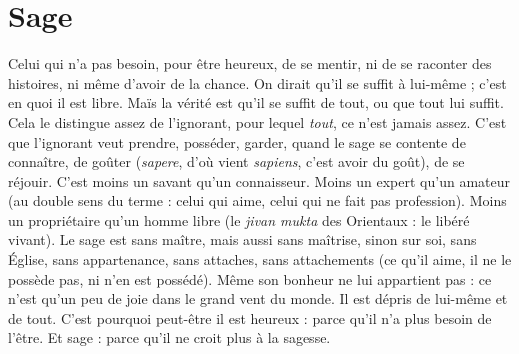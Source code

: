 \section{Sage}
Celui qui n’a pas besoin, pour être heureux, de se mentir, ni de se
raconter des histoires, ni même d’avoir de la chance. On dirait qu’il
se suffit à lui-même ; c’est en quoi il est libre. Maïs la vérité est qu’il se suffit de
tout, ou que tout lui suffit. Cela le distingue assez de l’ignorant, pour lequel
{\it tout}, ce n'est jamais assez. C’est que l’ignorant veut prendre, posséder, garder,
quand le sage se contente de connaître, de goûter ({\it sapere}, d’où vient {\it sapiens},
c'est avoir du goût), de se réjouir. C’est moins un savant qu’un connaisseur.
Moins un expert qu’un amateur (au double sens du terme : celui qui aime,
celui qui ne fait pas profession). Moins un propriétaire qu’un homme libre (le
{\it jivan mukta} des Orientaux : le libéré vivant). Le sage est sans maître, mais aussi
sans maîtrise, sinon sur soi, sans Église, sans appartenance, sans attaches, sans
attachements (ce qu’il aime, il ne le possède pas, ni n’en est possédé). Même
son bonheur ne lui appartient pas : ce n’est qu’un peu de joie dans le grand
vent du monde. Il est dépris de lui-même et de tout. C’est pourquoi peut-être
il est heureux : parce qu’il n’a plus besoin de l'être. Et sage : parce qu'il ne croit
plus à la sagesse.

